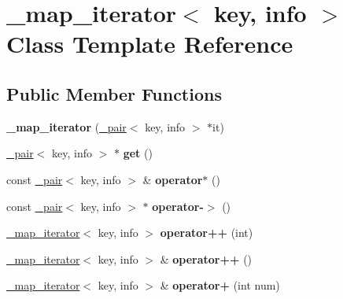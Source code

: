 \hypertarget{class__map__iterator}{}\section{\+\_\+map\+\_\+iterator$<$ key, info $>$ Class Template Reference}
\label{class__map__iterator}
\subsection*{Public Member Functions}
\begin{DoxyCompactItemize}
\item 
\mbox{\label{class__map__iterator_a639778acbbbc0052038be6a35b5cadd5}} 
{\bfseries \+\_\+map\+\_\+iterator} (\mbox{\hyperlink{struct__pair}{\+\_\+pair}}$<$ key, info $>$ $\ast$it)
\item 
\mbox{\label{class__map__iterator_a7d2730e65c11bf5f323c4a398f9c78a1}} 
\mbox{\hyperlink{struct__pair}{\+\_\+pair}}$<$ key, info $>$ $\ast$ {\bfseries get} ()
\item 
\mbox{\label{class__map__iterator_a8f254d4ee30e7c403fbdc1fc47662719}} 
const \mbox{\hyperlink{struct__pair}{\+\_\+pair}}$<$ key, info $>$ \& {\bfseries operator$\ast$} ()
\item 
\mbox{\label{class__map__iterator_a0a5a3a0c68b4e3a817db147a03579047}} 
const \mbox{\hyperlink{struct__pair}{\+\_\+pair}}$<$ key, info $>$ $\ast$ {\bfseries operator-\/$>$} ()
\item 
\mbox{\label{class__map__iterator_a0dd5b4912b23fb0e75a59aeb4f4bc067}} 
\mbox{\hyperlink{class__map__iterator}{\+\_\+map\+\_\+iterator}}$<$ key, info $>$ {\bfseries operator++} (int)
\item 
\mbox{\label{class__map__iterator_a89ef5ad9e29a9a43a321e3a58787c352}} 
\mbox{\hyperlink{class__map__iterator}{\+\_\+map\+\_\+iterator}}$<$ key, info $>$ \& {\bfseries operator++} ()
\item 
\mbox{\label{class__map__iterator_ae174f7b1ca0a5af42a92b03500493fde}} 
\mbox{\hyperlink{class__map__iterator}{\+\_\+map\+\_\+iterator}}$<$ key, info $>$ \& {\bfseries operator+} (int num)

\end{DoxyCompactItemize}
